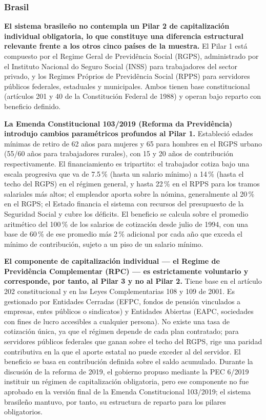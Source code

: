 \documentclass[12pt, letterpaper]{article}
\begin{document}
\subsubsection{Brasil}

\textbf{El sistema brasileño no contempla un Pilar 2 de capitalización individual obligatoria, lo que constituye una diferencia estructural relevante frente a los otros cinco países de la muestra.} El Pilar 1 está compuesto por el Regime Geral de Previdência Social (RGPS), administrado por el Instituto Nacional do Seguro Social (INSS) para trabajadores del sector privado, y los Regimes Próprios de Previdência Social (RPPS) para servidores públicos federales, estaduales y municipales. Ambos tienen base constitucional (artículos 201 y 40 de la Constitución Federal de 1988) y operan bajo reparto con beneficio definido.

\textbf{La Emenda Constitucional 103/2019 (Reforma da Previdência) introdujo cambios paramétricos profundos al Pilar 1.} Estableció edades mínimas de retiro de 62 años para mujeres y 65 para hombres en el RGPS urbano (55/60 años para trabajadores rurales), con 15 y 20 años de contribución respectivamente. El financiamiento es tripartito: el trabajador cotiza bajo una escala progresiva que va de 7.5\,\% (hasta un salario mínimo) a 14\,\% (hasta el techo del RGPS) en el régimen general, y hasta 22\,\% en el RPPS para los tramos salariales más altos; el empleador aporta sobre la nómina, generalmente al 20\,\% en el RGPS; el Estado financia el sistema con recursos del presupuesto de la Seguridad Social y cubre los déficits. El beneficio se calcula sobre el promedio aritmético del 100\,\% de los salarios de cotización desde julio de 1994, con una base de 60\,\% de ese promedio más 2\,\% adicional por cada año que exceda el mínimo de contribución, sujeto a un piso de un salario mínimo.

\textbf{El componente de capitalización individual --- el Regime de Previdência Complementar (RPC) --- es estrictamente voluntario y corresponde, por tanto, al Pilar 3 y no al Pilar 2.} Tiene base en el artículo 202 constitucional y en las Leyes Complementarias 108 y 109 de 2001. Es gestionado por Entidades Cerradas (EFPC, fondos de pensión vinculados a empresas, entes públicos o sindicatos) y Entidades Abiertas (EAPC, sociedades con fines de lucro accesibles a cualquier persona). No existe una tasa de cotización única, ya que el régimen depende de cada plan contratado; para servidores públicos federales que ganan sobre el techo del RGPS, rige una paridad contributiva en la que el aporte estatal no puede exceder al del servidor. El beneficio se basa en contribución definida sobre el saldo acumulado. Durante la discusión de la reforma de 2019, el gobierno propuso mediante la PEC 6/2019 instituir un régimen de capitalización obligatoria, pero ese componente no fue aprobado en la versión final de la Emenda Constitucional 103/2019; el sistema brasileño mantuvo, por tanto, su estructura de reparto para los pilares obligatorios.
\end{document}
